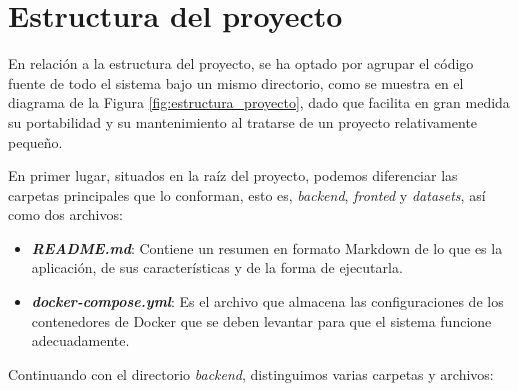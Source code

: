 \section{Estructura del proyecto}
\label{sec:estructura_proyecto}

En relación a la estructura del proyecto, se ha optado por agrupar el código fuente de todo el sistema
bajo un mismo directorio, como se muestra en el diagrama de la Figura \ref{fig:estructura_proyecto},
dado que facilita en gran medida su portabilidad y su mantenimiento al tratarse de un proyecto relativamente
pequeño.

\bigskip
En primer lugar, situados en la raíz del proyecto, podemos diferenciar las carpetas principales que lo conforman, esto es,
\textit{backend}, \textit{fronted} y \textit{datasets}, así como dos archivos:

\begin{itemize}
	\item \textbf{\textit{README.md}}: Contiene un resumen en formato Markdown \cite{markdown} de lo que es la aplicación, de sus características y de la forma de ejecutarla.
	\item \textbf{\textit{docker-compose.yml}}: Es el archivo que almacena las configuraciones de los contenedores de Docker que se deben levantar para que el sistema funcione adecuadamente.
\end{itemize}

\bigskip
Continuando con el directorio \textit{backend}, distinguimos varias carpetas y archivos:


